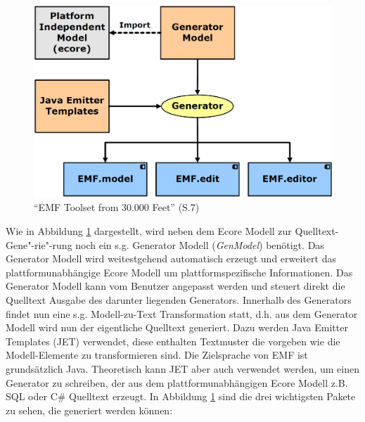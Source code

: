 \begin{figure}[htb]
  \centering
  \includegraphics[scale=0.18]{images/emf_toolset.png}
  \caption{"`EMF Toolset from 30.000 Feet"' \cite{EMFCon} (S.7)}
  \label{fig:emf_toolset}
\end{figure}

Wie in Abbildung \ref{fig:emf_toolset} dargestellt, wird neben dem Ecore Modell zur
Quelltext-Gene"-rie"-rung noch ein s.g. Generator Modell (\textit{GenModel}) benötigt. Das Generator
Modell wird weitestgehend automatisch erzeugt und erweitert das plattformunabhängige Ecore Modell um
plattformspezifische Informationen. Das Generator Modell kann vom Benutzer angepasst werden und
steuert direkt die Quelltext Ausgabe des darunter liegenden Generators. Innerhalb des Generators
findet nun eine s.g. Modell-zu-Text Transformation statt, d.h. aus dem Generator Modell wird nun der
eigentliche Quelltext generiert. Dazu werden Java Emitter Templates (JET) verwendet, diese enthalten
Textmuster die vorgeben wie die Modell-Elemente zu transformieren sind. Die Zielsprache von EMF ist
grundsätzlich Java. Theoretisch kann JET aber auch verwendet werden, um einen Generator zu
schreiben, der aus dem plattformunabhängigen Ecore Modell z.B. SQL oder C\# Quelltext erzeugt. In
Abbildung \ref{fig:emf_toolset} sind die drei wichtigsten Pakete zu sehen, die generiert werden
können:

